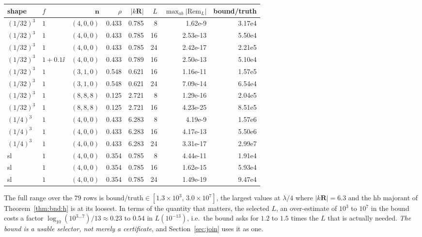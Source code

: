 \begin{center}\footnotesize
\begin{tabular}{@{}llrrrrrr@{}}
\toprule
shape & $f$ & $\mathbf{n}$ & $\rho$ & $|k\mathbf{R}|$ & $L$
& $\max_{ab}|\mathrm{Rem}_L|$ & bound/truth\\
\midrule
$(1/32)^3$ & $1$        & $(4,0,0)$    & 0.433 & 0.785 & 8  & 1.62e-9  & 3.17e4\\
$(1/32)^3$ & $1$        & $(4,0,0)$    & 0.433 & 0.785 & 16 & 2.53e-13 & 5.50e4\\
$(1/32)^3$ & $1$        & $(4,0,0)$    & 0.433 & 0.785 & 24 & 2.42e-17 & 2.21e5\\
$(1/32)^3$ & $1+0.1\ii$ & $(4,0,0)$    & 0.433 & 0.789 & 16 & 2.50e-13 & 5.10e4\\
$(1/32)^3$ & $1$        & $(3,1,0)$    & 0.548 & 0.621 & 16 & 1.16e-11 & 1.57e5\\
$(1/32)^3$ & $1$        & $(3,1,0)$    & 0.548 & 0.621 & 24 & 7.09e-14 & 6.54e4\\
$(1/32)^3$ & $1$        & $(8,8,8)$    & 0.125 & 2.721 & 8  & 1.29e-16 & 2.04e5\\
$(1/32)^3$ & $1$        & $(8,8,8)$    & 0.125 & 2.721 & 16 & 4.23e-25 & 8.51e5\\
$(1/4)^3$  & $1$        & $(4,0,0)$    & 0.433 & 6.283 & 8  & 4.19e-9  & 1.57e6\\
$(1/4)^3$  & $1$        & $(4,0,0)$    & 0.433 & 6.283 & 16 & 4.17e-13 & 5.50e6\\
$(1/4)^3$  & $1$        & $(4,0,0)$    & 0.433 & 6.283 & 24 & 3.31e-17 & 2.99e7\\
sl         & $1$        & $(4,0,0)$    & 0.354 & 0.785 & 8  & 4.44e-11 & 1.91e4\\
sl         & $1$        & $(4,0,0)$    & 0.354 & 0.785 & 16 & 1.62e-15 & 5.93e4\\
sl         & $1$        & $(4,0,0)$    & 0.354 & 0.785 & 24 & 1.49e-19 & 9.47e4\\
\bottomrule
\end{tabular}
\end{center}

\noindent
The full range over the $79$ rows is $\mathrm{bound}/\mathrm{truth} \in
[1.3\times10^{3},\,3.0\times10^{7}]$, the largest values at $\lambda/4$ where
$|k\mathbf{R}| = 6.3$ and the $\mathrm{hb}$ majorant of Theorem~\ref{thm:bnd:h} is at its
loosest. In terms of the quantity that matters, the selected $L$, an over-estimate of
$10^{3}$ to $10^{7}$ in the bound costs a factor $\log_{10}(10^{3\dots7})/13 \approx
0.23$ to $0.54$ in $L(10^{-13})$, i.e.\ the bound asks for $1.2$ to $1.5$ times the $L$
that is actually needed. \emph{The bound is a usable selector, not merely a certificate},
and Section~\ref{sec:join} uses it as one.

